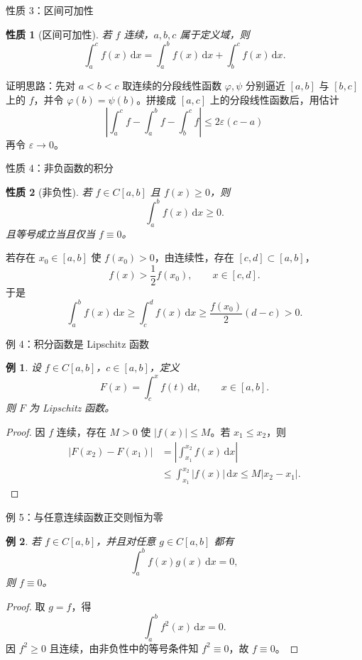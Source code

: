 ﻿\documentclass[aspectratio=169,11pt]{ctexbeamer}
\newtheorem{myprop}{性质}
\newtheorem{myex}{例}
\newcommand{\dd}{\,\mathrm{d}}
\newcommand{\abs}[1]{\left|#1\right|}
\begin{document}
\begin{frame}{性质 3：区间可加性}
  \begin{myprop}[区间可加性]
  若 $f$ 连续，$a,b,c$ 属于定义域，则
  \[
    \int_a^c f(x)\dd x
    =\int_a^b f(x)\dd x+\int_b^c f(x)\dd x.
  \]
  \end{myprop}

  证明思路：先对 $a<b<c$ 取连续的分段线性函数 $\varphi,\psi$ 分别逼近
  $[a,b]$ 与 $[b,c]$ 上的 $f$，并令 $\varphi(b)=\psi(b)$。拼接成 $[a,c]$ 上的分段线性函数后，用估计
  \[
    \abs{\int_a^c f-\int_a^b f-\int_b^c f}
    \le 2\varepsilon(c-a)
  \]
  再令 $\varepsilon\to0$。
\end{frame}

\begin{frame}{性质 4：非负函数的积分}
  \begin{myprop}[非负性]
  若 $f\in C[a,b]$ 且 $f(x)\ge0$，则
  \[
    \int_a^b f(x)\dd x\ge0.
  \]
  且等号成立当且仅当 $f\equiv0$。
  \end{myprop}

  若存在 $x_0\in[a,b]$ 使 $f(x_0)>0$，由连续性，存在 $[c,d]\subset[a,b]$，
  \[
    f(x)>\frac12 f(x_0),\qquad x\in[c,d].
  \]
  于是
  \[
    \int_a^b f(x)\dd x
    \ge\int_c^d f(x)\dd x
    \ge \frac{f(x_0)}2(d-c)>0.
  \]
\end{frame}

\begin{frame}{例 4：积分函数是 Lipschitz 函数}
  \footnotesize
  \begin{myex}
  设 $f\in C[a,b]$，$c\in[a,b]$，定义
  \[
    F(x)=\int_c^x f(t)\dd t,\qquad x\in[a,b].
  \]
  则 $F$ 为 Lipschitz 函数。
  \end{myex}

  \begin{proof}
  因 $f$ 连续，存在 $M>0$ 使 $\abs{f(x)}\le M$。若 $x_1\le x_2$，则
  \[
  \begin{aligned}
    \abs{F(x_2)-F(x_1)}
    &=\abs{\int_{x_1}^{x_2}f(x)\dd x}\\
    &\le\int_{x_1}^{x_2}\abs{f(x)}\dd x
    \le M\abs{x_2-x_1}.
  \end{aligned}
  \]
  \end{proof}
\end{frame}

\begin{frame}{例 5：与任意连续函数正交则恒为零}
  \begin{myex}
  若 $f\in C[a,b]$，并且对任意 $g\in C[a,b]$ 都有
  \[
    \int_a^b f(x)g(x)\dd x=0,
  \]
  则 $f\equiv0$。
  \end{myex}

  \begin{proof}
  取 $g=f$，得
  \[
    \int_a^b f^2(x)\dd x=0.
  \]
  因 $f^2\ge0$ 且连续，由非负性中的等号条件知 $f^2\equiv0$，故 $f\equiv0$。
  \end{proof}
\end{frame}
\end{document}
